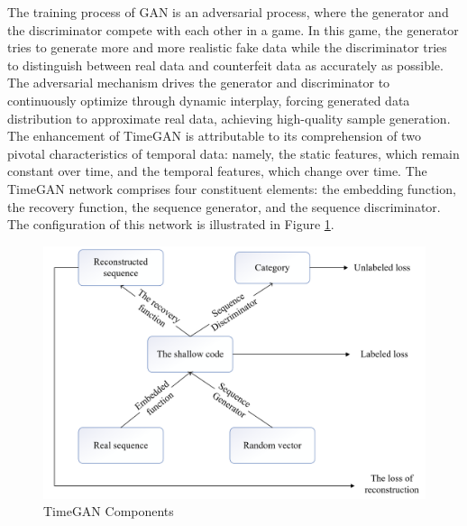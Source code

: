 \documentclass[journal,article,submit,pdftex,moreauthors]{Definitions/mdpi}
\begin{document}
The training process of GAN is an adversarial process, where the generator and the discriminator compete with each other in a game. In this game, the generator tries to generate more and more realistic fake data while the discriminator tries to distinguish between real data and counterfeit data as accurately as possible. The adversarial mechanism drives the generator and discriminator to continuously optimize through dynamic interplay, forcing generated data distribution to approximate real data, achieving high-quality sample generation. The enhancement of TimeGAN \cite{Yoon2019} is attributable to its comprehension of two pivotal characteristics of temporal data: namely, the static features, which remain constant over time, and the temporal features, which change over time. The TimeGAN network comprises four constituent elements: the embedding function, the recovery function, the sequence generator, and the sequence discriminator. The configuration of this network is illustrated in Figure \ref{fig:timegan}.  


\begin{figure}[H]
    \centering
    \includegraphics[width=0.95\linewidth]{图片/timegan组成.png}
    \caption{TimeGAN Components}
    \label{fig:timegan}
\end{figure}
\end{document}
